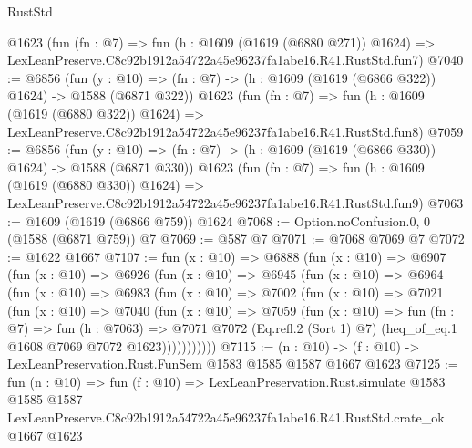 \begin{lexlean}{RustStd}
\begin{coremodule}
    @1623
    (fun (fn : @7) =>
    fun (h : @1609 (@1619 (@6880 @271)) @1624) =>
    LexLeanPreserve.C8c92b1912a54722a45e96237fa1abe16.R41.RustStd.fun7)
@7040 := @6856
    (fun (y : @10) => (fn : @7) -> (h : @1609 (@1619 (@6866 @322)) @1624) -> @1588 (@6871 @322))
    @1623
    (fun (fn : @7) =>
    fun (h : @1609 (@1619 (@6880 @322)) @1624) =>
    LexLeanPreserve.C8c92b1912a54722a45e96237fa1abe16.R41.RustStd.fun8)
@7059 := @6856
    (fun (y : @10) => (fn : @7) -> (h : @1609 (@1619 (@6866 @330)) @1624) -> @1588 (@6871 @330))
    @1623
    (fun (fn : @7) =>
    fun (h : @1609 (@1619 (@6880 @330)) @1624) =>
    LexLeanPreserve.C8c92b1912a54722a45e96237fa1abe16.R41.RustStd.fun9)
@7063 := @1609 (@1619 (@6866 @759)) @1624
@7068 := Option.noConfusion.{0, 0} (@1588 (@6871 @759)) @7
@7069 := @587 @7
@7071 := @7068 @7069 @7
@7072 := @1622 @1667
@7107 := fun (x : @10) =>
  @6888
    (fun (x : @10) =>
    @6907
      (fun (x : @10) =>
      @6926
        (fun (x : @10) =>
        @6945
          (fun (x : @10) =>
          @6964
            (fun (x : @10) =>
            @6983
              (fun (x : @10) =>
              @7002
                (fun (x : @10) =>
                @7021
                  (fun (x : @10) =>
                  @7040
                    (fun (x : @10) =>
                    @7059
                      (fun (x : @10) =>
                      fun (fn : @7) =>
                      fun (h : @7063) =>
                      @7071
                        @7072
                        (Eq.refl.{2} (Sort 1) @7)
                        (heq_of_eq.{1} @1608 @7069 @7072 @1623)))))))))))
@7115 := (n : @10) -> (f : @10) -> LexLeanPreservation.Rust.FunSem @1583 @1585 @1587 @1667 @1623
@7125 := fun (n : @10) =>
  fun (f : @10) =>
  LexLeanPreservation.Rust.simulate
    @1583
    @1585
    @1587
    LexLeanPreserve.C8c92b1912a54722a45e96237fa1abe16.R41.RustStd.crate_ok
    @1667
    @1623
\end{coremodule}
\end{lexlean}
